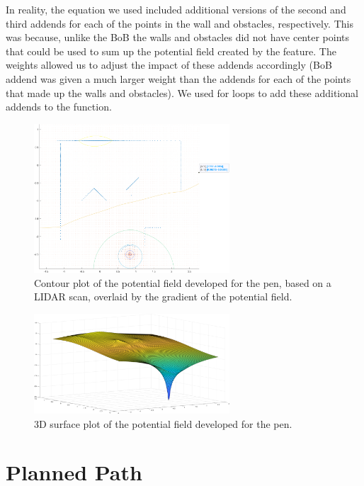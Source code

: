 In reality, the equation we used included additional versions of the second and third addends for each of the points in the wall and obstacles, respectively. This was because, unlike the BoB the walls and obstacles did not have center points that could be used to sum up the potential field created by the feature. The weights allowed us to adjust the impact of these addends accordingly (BoB addend was given a much larger weight than the addends for each of the points that made up the walls and obstacles). We used for loops to add these additional addends to the function.

\begin{figure}[h!]
    \centering
    \includegraphics[width=0.65\textwidth]{img/contour_map.png}
    \caption{Contour plot of the potential field developed for the pen, based on a LIDAR scan, overlaid by the gradient of the potential field.}
    \label{fig:contourgradient}
\end{figure}

\begin{figure}[h!]
    \centering
    \includegraphics[width=0.65\textwidth]{img/surf.png}
    \caption{3D surface plot of the potential field developed for the pen.}
    \label{fig:surf}
\end{figure}

\pagebreak

\section{Planned Path}

